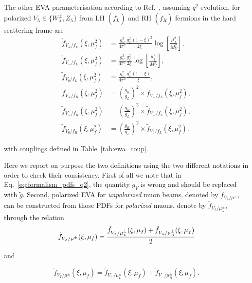 \documentclass[a4paper,11pt]{article}
\begin{document}
The other EVA parameterisation  according to Ref.~\cite{Ruiz:2021tdt}, assuming $q^2$ evolution,
 for polarized $V_\lambda\in\{W_\lambda^\pm,Z_\lambda\}$ from LH $(\tilde{f}_L)$ and RH $(\tilde{f}_R)$ fermions in the hard scattering frame are 
\begin{subequations}
\label{eq:formalism_pdfs_q2}
\begin{align}
\tilde{f}_{V_+/f_L}(\xi,\mu_f^2) 	&= \frac{g_V^2}{4\pi^2} \frac{g_L^2(1-\xi)^2}{2\xi} \log \left[\frac{\mu_f^2}{M_V^2}\right], \\
\tilde{f}_{V_-/f_L}(\xi,\mu_f^2) 	&= \frac{g_V^2}{4\pi^2} \frac{g_L^2}{2\xi} \log \left[\frac{\mu_f^2}{M_V^2}\right], \\
\tilde{f}_{V_0 / f_L}(\xi,\mu_f^2) 	&= \frac{g_V^2}{4\pi^2} \frac{g_L^2(1-\xi)}{\xi},\\  
\tilde{f}_{V_+/f_R}(\xi,\mu_f^2) 	&= \left(\frac{g_R}{g_L}\right)^2 \times \tilde{f}_{V_-/f_L}(\xi,\mu_f^2), \\
\tilde{f}_{V_-/f_R}(\xi,\mu_f^2) 	&= \left(\frac{g_R}{g_L}\right)^2 \times \tilde{f}_{V_+/f_L}(\xi,\mu_f^2), \\
\tilde{f}_{V_0/f_R}(\xi,\mu_f^2) 	&= \left(\frac{g_R}{g_L}\right)^2 \times \tilde{f}_{V_0/f_L}(\xi,\mu_f^2). 
\end{align}
\end{subequations}

with couplings defined in Table~\ref{tab:ewa_coup}.

Here we report on purpose the two definitions using the two different notations in order to check their consistency.
First of all we note that in Eq.~\eqref{eq:formalism_pdfs_q2}, the quantity $g_V$ is wrong and should be replaced with $\tilde{g}$. Second,
polarized EVA for \textit{unpolarized} muon beams, denoted by $\tilde{f}_{V_\lambda/\mu^\pm}$, can be constructed from those PDFs for \textit{polarized} muons, denote by $\tilde{f}_{V_\lambda/\mu^\pm_\lambda}$, through the relation
\begin{equation}
 \tilde{f}_{V_\lambda/\mu^\pm}(\xi,\mu_f) =
 \cfrac{\tilde{f}_{V_\lambda/\mu^\pm_L}(\xi,\mu_f) + \tilde{f}_{V_\lambda/\mu^\pm_R}(\xi,\mu_f)}{2}
\label{eq:pdfDef_unpolarizedMuon}
\end{equation}

and 

\begin{equation}
 \tilde{f}_{V_T/\mu^\pm}(\xi,\mu_f) =
\tilde{f}_{V_+/\mu^\pm_L}(\xi,\mu_f) + \tilde{f}_{V_-/\mu^\pm_R}(\xi,\mu_f).
\label{eq:pdfDef_unpolarizedMuon}
\end{equation}
\end{document}
